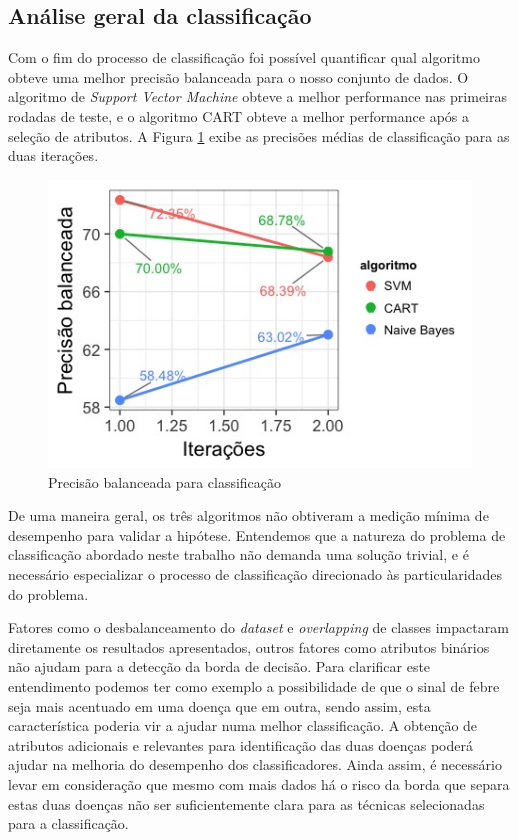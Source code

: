 \subsection{Análise geral da classificação}

Com o fim do processo de classificação foi possível quantificar qual algoritmo obteve uma melhor precisão balanceada para o nosso conjunto de dados. O algoritmo de \textit{Support Vector Machine} obteve a melhor performance nas primeiras rodadas de teste, e o algoritmo CART obteve a melhor performance após a seleção de atributos. A Figura \ref{fig:precisoesbalanceadas} exibe as precisões médias de classificação para as duas iterações.

\begin{figure}[htb]
  \caption{\label{fig:precisoesbalanceadas}Precisão balanceada para classificação}
  \begin{center}
    \includegraphics[scale=0.7]{imagens/atributos_selecao_desempenho_linhas.jpeg}
  \end{center}
\end{figure}

De uma maneira geral, os três algoritmos não obtiveram a medição  mínima de desempenho para validar a hipótese. Entendemos que a natureza do problema de classificação abordado neste trabalho não demanda uma solução trivial, e é necessário especializar o processo de classificação direcionado às particularidades do problema.

Fatores como o desbalanceamento do \textit{dataset} e \textit{overlapping} de classes impactaram diretamente os resultados apresentados, outros fatores como atributos binários não ajudam para a detecção da borda de decisão. Para clarificar este entendimento podemos ter como exemplo a possibilidade de que o sinal de febre seja mais acentuado em uma doença que em outra, sendo assim, esta característica poderia vir a ajudar numa melhor classificação. A obtenção de atributos adicionais e relevantes para identificação  das  duas doenças poderá ajudar na melhoria do desempenho  dos classificadores. Ainda assim, é necessário levar em consideração que mesmo com mais dados há o risco da borda que separa estas duas doenças não ser suficientemente clara para as técnicas selecionadas para a classificação.

